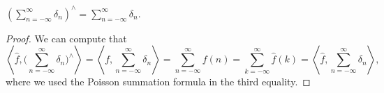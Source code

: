 \begin{theorem}
  $(\sum_{n = -\infty}^\infty \delta_n)^\wedge = \sum_{n = -\infty}^\infty \delta_n$.
\end{theorem}

\begin{proof}
  We can compute that
  \[
    \left\langle \widehat{f}, \Big(\sum_{n = -\infty}^\infty \delta_n\Big)^\wedge \right\rangle
    = \left\langle f, \sum_{n = -\infty}^\infty \delta_n \right\rangle
    = \sum_{n = -\infty}^\infty f(n)
    = \sum_{k = -\infty}^\infty \widehat{f}(k)
    = \left\langle \widehat{f}, \sum_{n = -\infty}^\infty \delta_n \right\rangle,
  \]
  where we used the Poisson summation
  formula in the third equality.
\end{proof}
